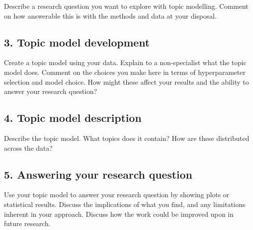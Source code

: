 \documentclass[
]{article}
\begin{document}
Describe a research question you want to explore with topic modelling.
Comment on how answerable this is with the methods and data at your
disposal.

\hypertarget{topic-model-development}{%
\subsection{3. Topic model development}\label{topic-model-development}}

Create a topic model using your data. Explain to a non-specialist what
the topic model does. Comment on the choices you make here in terms of
hyperparameter selection and model choice. How might these affect your
results and the ability to answer your research question?

\hypertarget{topic-model-description}{%
\subsection{4. Topic model description}\label{topic-model-description}}

Describe the topic model. What topics does it contain? How are these
distributed across the data?

\hypertarget{answering-your-research-question}{%
\subsection{5. Answering your research
question}\label{answering-your-research-question}}

Use your topic model to answer your research question by showing plots
or statistical results. Discuss the implications of what you find, and
any limitations inherent in your approach. Discuss how the work could be
improved upon in future research.

  
\end{document}
